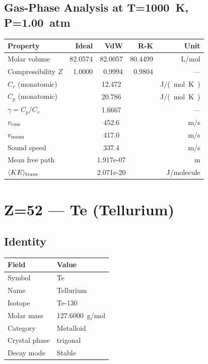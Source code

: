 \documentclass[11pt,a4paper]{article}
\begin{document}
\subsection{Gas-Phase Analysis at T=\SI{1000}{K}, P=\SI{1.00}{atm}}
\begin{tabular}{lrrrr}
  \toprule
  Property & Ideal & VdW & R-K & Unit \\
  \midrule
  Molar volume & 82.0574 & 82.0057 & 80.4499 & \si{L/mol} \\
  Compressibility $Z$ & 1.0000 & 0.9994 & 0.9804 & --- \\
  \midrule
  $C_v$ (monatomic) & \multicolumn{3}{c}{12.472} & \si{J/(mol.K)} \\
  $C_p$ (monatomic) & \multicolumn{3}{c}{20.786} & \si{J/(mol.K)} \\
  $\gamma = C_p/C_v$ & \multicolumn{3}{c}{1.6667} & --- \\
  $v_{\rm rms}$ & \multicolumn{3}{c}{452.6} & \si{m/s} \\
  $v_{\rm mean}$ & \multicolumn{3}{c}{417.0} & \si{m/s} \\
  Sound speed & \multicolumn{3}{c}{337.4} & \si{m/s} \\
  Mean free path & \multicolumn{3}{c}{1.917e-07} & \si{m} \\
  $\langle KE \rangle_{\rm trans}$ & \multicolumn{3}{c}{2.071e-20} & \si{J/molecule} \\
  \bottomrule
\end{tabular}

\newpage

\section{Z=52 --- Te (Tellurium)}
\label{sec:Z52}

\subsection{Identity}
\begin{tabular}{ll}
  \toprule
  Field & Value \\
  \midrule
  Symbol & Te \\
  Name & Tellurium \\
  Isotope & Te-130 \\
  Molar mass & \SI{127.6000}{g/mol} \\
  Category & Metalloid \\
  Crystal phase & trigonal \\
  Decay mode & Stable \\
  \bottomrule
\end{tabular}
\end{document}
